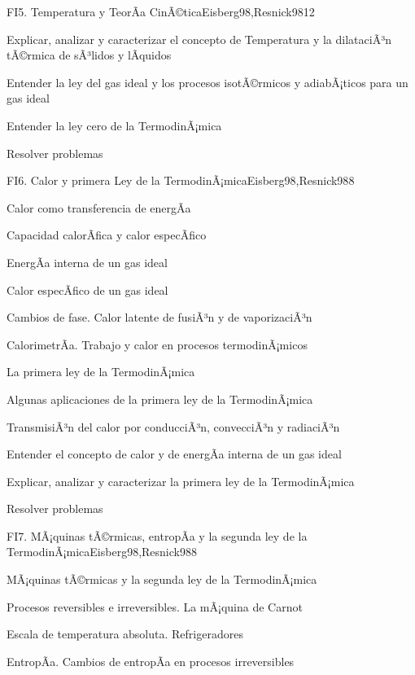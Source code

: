 \begin{syllabus}
\begin{unit}{FI5. Temperatura y TeorÃ­a CinÃ©tica}{Eisberg98,Resnick98}{12}
   \begin{unitgoals}
         \item  Explicar, analizar y caracterizar el concepto de Temperatura y la dilataciÃ³n tÃ©rmica de sÃ³lidos y lÃ­quidos
         \item  Entender la ley del gas ideal y los procesos isotÃ©rmicos y adiabÃ¡ticos para un gas ideal
         \item  Entender la ley cero de la TermodinÃ¡mica
         \item  Resolver problemas
   \end{unitgoals}
\end{unit}

\begin{unit}{FI6. Calor y primera Ley de la TermodinÃ¡mica}{Eisberg98,Resnick98}{8}
\begin{topics}
         \item  Calor como transferencia de energÃ­a
	 \item  Capacidad calorÃ­fica y calor especÃ­fico
         \item  EnergÃ­a interna de un gas ideal
	 \item  Calor especÃ­fico de un gas ideal
         \item  Cambios de fase. Calor latente de fusiÃ³n y de vaporizaciÃ³n
	 \item  CalorimetrÃ­a. Trabajo y calor en procesos termodinÃ¡micos
         \item  La primera ley de la TermodinÃ¡mica
	 \item  Algunas aplicaciones de la primera ley de la TermodinÃ¡mica
         \item  TransmisiÃ³n del calor por conducciÃ³n, convecciÃ³n y radiaciÃ³n
   \end{topics}

   \begin{unitgoals}
         \item  Entender el concepto de calor y de energÃ­a interna de un gas ideal
         \item  Explicar, analizar y caracterizar la primera ley de la TermodinÃ¡mica
         \item  Resolver problemas
   \end{unitgoals}
\end{unit}

\begin{unit}{FI7. MÃ¡quinas tÃ©rmicas, entropÃ­a y la segunda ley de la TermodinÃ¡mica}{Eisberg98,Resnick98}{8}
\begin{topics}
         \item  MÃ¡quinas tÃ©rmicas y la segunda ley de la TermodinÃ¡mica
	 \item  Procesos reversibles e irreversibles. La mÃ¡quina de Carnot
         \item  Escala de temperatura absoluta. Refrigeradores
	 \item  EntropÃ­a. Cambios de entropÃ­a en procesos irreversibles
   \end{topics}


\end{unit}
\end{syllabus}
